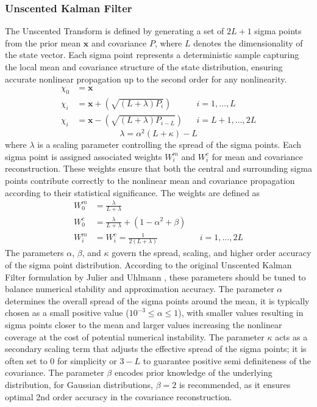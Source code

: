 \subsubsection{Unscented Kalman Filter}
The Unscented Transform is defined by generating a set of $2L + 1$ sigma points from the prior mean $\mathbf{x}$ and covariance $P$, where $L$ denotes the dimensionality of the state vector. Each sigma point represents a deterministic sample capturing the local mean and covariance structure of the state distribution, ensuring accurate nonlinear propagation up to the second order for any nonlinearity.
$$
\begin{aligned}
    \chi_0 &= \mathbf{x} \\
    \chi_i &= \mathbf{x} + (\sqrt{(L + \lambda)P_i})              && i = 1, \ldots, L \\
    \chi_i &= \mathbf{x} - (\sqrt{(L + \lambda)P_{i - L} })       && i = L+1, \ldots, 2L
\end{aligned}
$$
$$
    \lambda = \alpha^2 (L + \kappa) - L
$$
where $\lambda$ is a scaling parameter controlling the spread of the sigma points. Each sigma point is assigned associated weights $W_i^m$ and $W_i^c$ for mean and covariance reconstruction. These weights ensure that both the central and surrounding sigma points contribute correctly to the nonlinear mean and covariance propagation according to their statistical significance. The weights are defined as
$$
\begin{aligned}
    W_0^m &= \frac{\lambda}{L + \lambda} \\
    W_0^c &= \frac{\lambda}{L + \lambda} + (1 - \alpha^2 + \beta) \\
    W_i^m &= W_i^c = \frac{1}{2(L + \lambda)}                           && i = 1, \ldots, 2L
\end{aligned}
$$
The parameters $\alpha$, $\beta$, and $\kappa$ govern the spread, scaling, and higher order accuracy of the sigma point distribution. According to the original Unscented Kalman Filter formulation by Julier and Uhlmann \cite{ukf}, these parameters should be tuned to balance numerical stability and approximation accuracy. The parameter $\alpha$ determines the overall spread of the sigma points around the mean, it is typically chosen as a small positive value ($10^{-3} \leq \alpha \leq 1$), with smaller values resulting in sigma points closer to the mean and larger values increasing the nonlinear coverage at the cost of potential numerical instability. The parameter $\kappa$ acts as a secondary scaling term that adjusts the effective spread of the sigma points; it is often set to $0$ for simplicity or $3 - L$ to guarantee positive semi definiteness of the covariance. The parameter $\beta$ encodes prior knowledge of the underlying distribution, for Gaussian distributions, $\beta = 2$ is recommended, as it ensures optimal 2nd order accuracy in the covariance reconstruction. 

